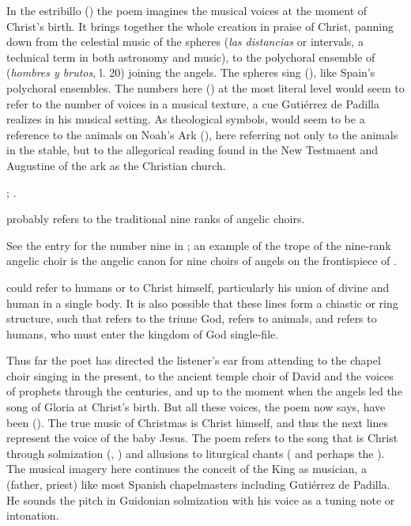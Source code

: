 In the estribillo () the poem imagines the musical voices at
the moment of Christ's birth.
It brings together the whole creation in praise of Christ, panning down from
the celestial music of the spheres (\emph{las distancias} or intervals, a
technical term in both astronomy and music), to the polychoral ensemble of
 (\emph{hombres y brutos}, l. 20) joining the angels.
The spheres sing  (), like
Spain's polychoral ensembles.
The numbers here () at the most
literal level would seem to refer to the number of voices in a musical texture,
a cue Gutiérrez de Padilla realizes in his musical setting.
As theological symbols,  would seem to be a reference to the
animals on Noah's Ark (), here referring not only to the
animals in the stable, but to the allegorical reading found in the New
Testmaent and Augustine of the ark as the Christian church.%
\begin{Footnote}
    ; \autocite[15]{Augustine:CivitateDei}.
\end{Footnote}
 probably refers to the traditional nine ranks of angelic
choirs.%
\begin{Footnote}
    See the entry for the number nine in \autocite{Bongo:NumerorumMysteria}; an
    example of the trope of the nine-rank angelic choir is the angelic canon
    for nine choirs of angels on the frontispiece of
    \autocite{Kircher:Musurgia}.
\end{Footnote}
 could refer to humans or to Christ himself, particularly his
union of divine and human in a single body.
It is also possible that these lines form a chiastic or ring structure, such
that  refers to the triune God, 
refers to animals, and  refers to humans, who must enter the
kingdom of God single-file.

Thus far the poet has directed the listener's ear from attending to the chapel
choir singing in the present, to the ancient temple choir of David and the
voices of prophets through the centuries, and up to the moment when the angels
led the song of Gloria at Christ's birth.
But all these voices, the poem now says, have been  ().
The true music of Christmas is Christ himself, and thus the next lines represent
the voice of the baby Jesus.
The poem refers to the song that is Christ through solmization (,
) and allusions to liturgical chants ( and perhaps the
).
The musical imagery here continues the conceit of the King as musician, a
 (father, priest) like most Spanish chapelmasters including
Gutiérrez de Padilla.
He sounds the pitch  in Guidonian solmization with his
voice as a tuning note or intonation.

